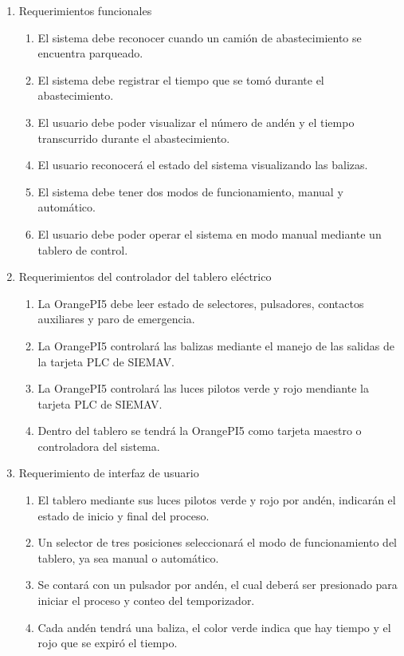 \documentclass[
11pt, %
]{charter}
\begin{document}
\begin{enumerate}
	\item Requerimientos funcionales
		\begin{enumerate}
			\item El sistema debe reconocer cuando un camión de abastecimiento se encuentra parqueado.
			\item El sistema debe registrar el tiempo que se tomó durante el abastecimiento.
			\item El usuario debe poder visualizar el número de andén y el tiempo transcurrido durante el abastecimiento.
			\item El usuario reconocerá el estado del sistema visualizando las balizas.
			\item El sistema debe tener dos modos de funcionamiento, manual y automático.
			\item El usuario debe poder operar el sistema en modo manual mediante un tablero de control.
		\end{enumerate}
	\item Requerimientos del controlador del tablero eléctrico
		\begin{enumerate}
			\item La OrangePI5 debe leer estado de selectores, pulsadores, contactos auxiliares y paro de emergencia.
			\item La OrangePI5 controlará las balizas mediante el manejo de las salidas de la tarjeta PLC de SIEMAV.
			\item La OrangePI5 controlará las luces pilotos verde y rojo mendiante la tarjeta PLC de SIEMAV.
			\item Dentro del tablero se tendrá la OrangePI5 como tarjeta maestro o controladora del sistema.
		\end{enumerate}
	\item Requerimiento de interfaz de usuario
		\begin{enumerate}
			\item El tablero mediante sus luces pilotos verde y rojo por andén, indicarán el estado de inicio y final del proceso.
			\item Un selector de tres posiciones seleccionará el modo de funcionamiento del tablero, ya sea manual o automático.
			\item Se contará con un pulsador por andén, el cual deberá ser presionado para iniciar el proceso y conteo del temporizador.
			\item Cada andén tendrá una baliza, el color verde indica que hay tiempo y el rojo que se expiró el tiempo.

\end{enumerate}
\end{enumerate}
\end{document}
